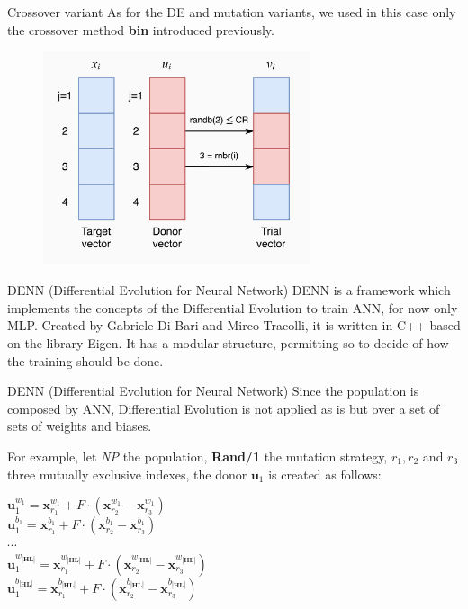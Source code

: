 \documentclass[xcolor={usenames}]{beamer}
\begin{document}
  \begin{frame}{Crossover variant}
	As for the DE and mutation variants, we used in this case only the crossover method \textbf{bin} introduced previously.
	\begin{figure}
		\centering
		\includegraphics[width=0.7\textwidth]{../figures/bin-4.png}
	\end{figure}
  \end{frame}
  \begin{frame}{DENN (Differential Evolution for Neural Network)}
  	DENN is a framework which implements the concepts of the Differential Evolution to train ANN, for now only MLP. Created by Gabriele Di Bari and Mirco Tracolli, it is written in C++ based on the library Eigen. It has a modular structure, permitting so to decide of how the training should be done.
  \end{frame}
  \begin{frame}{	DENN (Differential Evolution for Neural Network)}
  	Since the population is composed by ANN, Differential Evolution is not applied as is but over a set of sets of weights and biases. 
  	
  	For example, let \textit{NP} the population, \textbf{Rand/1} the mutation strategy, $r_1, r_2$ and $r_3$ three mutually exclusive indexes, the donor $\textbf{u}_{1}$ is created as follows:
	\begin{center}
		$\textbf{u}_{1}^{w_1} = \textbf{x}_{r_1}^{w_1} + F \cdot (\textbf{x}_{r_2}^{w_1} - \textbf{x}_{r_3}^{w_1})$\\
		$\textbf{u}_{1}^{b_1} = \textbf{x}_{r_1}^{b_1} + F \cdot (\textbf{x}_{r_2}^{b_1} - \textbf{x}_{r_3}^{b_1})$\\
		$\cdots$\\
		$\textbf{u}_{1}^{w_{|\textbf{HL}|}} = \textbf{x}_{r_1}^{w_{|\textbf{HL}|}} + F \cdot (\textbf{x}_{r_2}^{w_{|\textbf{HL}|}} - \textbf{x}_{r_3}^{w_{|\textbf{HL}|}})$\\
		$\textbf{u}_{1}^{b_{|\textbf{HL}|}} = \textbf{x}_{r_1}^{b_{|\textbf{HL}|}} + F \cdot (\textbf{x}_{r_2}^{b_{|\textbf{HL}|}} - \textbf{x}_{r_3}^{b_{|\textbf{HL}|}})$\\
	\end{center}
  \end{frame}
\end{document}
